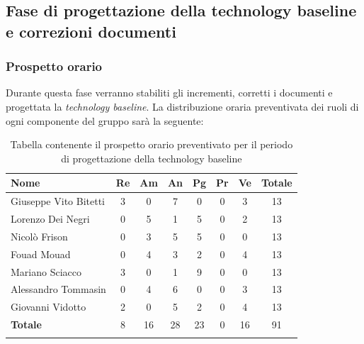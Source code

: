 	
	
	\subsection{Fase di progettazione della technology baseline e correzioni documenti}
		\subsubsection{Prospetto orario}
		Durante questa fase verranno stabiliti gli incrementi, corretti i documenti e progettata la \textit{technology baseline}. La distribuzione oraria preventivata dei ruoli di ogni componente del gruppo sarà la seguente:
		
		\begin{longtable}{|l|c|c|c|c|c|c|c|}
			\hline
			\rowcolor{lighter-grayer}
			\textbf{Nome} & \textbf{Re} & \textbf{Am} & \textbf{An} & \textbf{Pg}  & \textbf{Pr}   & \textbf{Ve} & \textbf{Totale} \\
			\hline
			\endfirsthead
			
			\hline
			Giuseppe Vito Bitetti 		& 3 & 0 & 7 & 0 & 0 & 3 & 13\\
			\hline
			\hline
			Lorenzo Dei Negri			& 0 & 5 & 1 & 5 & 0 & 2 & 13\\
			\hline
			\hline
			Nicolò Frison				   & 0 & 3 & 5 & 5 & 0 & 0 & 13\\
			\hline
			\hline
			Fouad Mouad 				& 0 & 4 & 3 & 2 & 0 & 4 & 13\\
			\hline
			\hline
			Mariano Sciacco 			& 3& 0 & 1 & 9 & 0 & 0 & 13\\
			\hline
			\hline
			Alessandro Tommasin    & 0 & 4 & 6 & 0 & 0 & 3 & 13\\
			\hline
			\hline
			Giovanni Vidotto 			& 2 & 0 & 5 & 2 & 0 & 4 & 13\\
			\hline 
			\textbf{Totale}			 & 8 &  16 & 28 & 23 & 0 & 16 & 91\\
			\hline
			\caption{Tabella contenente il prospetto orario preventivato per il periodo di progettazione della technology baseline}
		\end{longtable}
		\pagebreak
		
